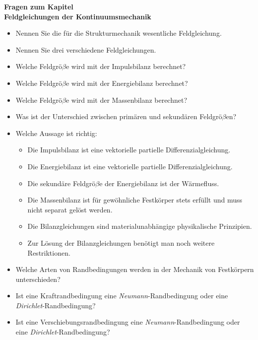 \begin{framed}
\textbf{Fragen zum Kapitel}\\
\textbf{Feldgleichungen der Kontinuumsmechanik}

\begin{itemize}
\item Nennen Sie die für die Strukturmechanik wesentliche Feldgleichung.


\item Nennen Sie drei verschiedene Feldgleichungen.


\item Welche Feldgrö$\beta$e wird mit der Impulsbilanz berechnet?


\item Welche Feldgrö$\beta$e wird mit der Energiebilanz berechnet?


\item Welche Feldgrö$\beta$e wird mit der Massenbilanz berechnet?


\item Was ist der Unterschied zwischen primären und sekundären Feldgrö$\beta$en?


\item Welche Aussage ist richtig:

\begin{itemize}
\item Die Impulsbilanz ist eine vektorielle partielle Differenzialgleichung.
\item Die Energiebilanz ist eine vektorielle partielle Differenzialgleichung.
\item Die sekundäre Feldgrö$\beta$e der Energiebilanz ist der Wärmefluss.
\item Die Massenbilanz ist für gewöhnliche Festkörper stets erfüllt und muss nicht separat gelöst werden.
\item Die Bilanzgleichungen sind materialunabhängige physikalische Prinzipien.
\item Zur Lösung der Bilanzgleichungen benötigt man noch weitere Restriktionen.
\end{itemize}


\item Welche Arten von Randbedingungen werden in der Mechanik von Festkörpern unterschieden?


\item Ist eine Kraftrandbedingung eine \textit{Neumann}-Randbedingung oder eine \textit{Dirichlet}-Randbedingung?


\item Ist eine Verschiebungsrandbedingung eine \textit{Neumann}-Randbedingung oder eine \textit{Dirichlet}-Randbedingung?
\end{itemize}


\end{framed}

